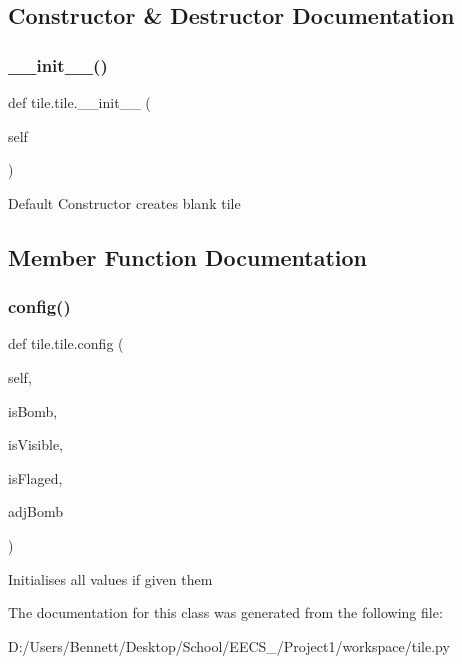 \subsection{Constructor \& Destructor Documentation}
\mbox{\label{classtile_1_1tile_a8a06fff9b10c8cb32195e21005d9ebc3}} 
\subsubsection{\texorpdfstring{\+\_\+\+\_\+init\+\_\+\+\_\+()}{\_\_init\_\_()}}
{\footnotesize\ttfamily def tile.\+tile.\+\_\+\+\_\+init\+\_\+\+\_\+ (\begin{DoxyParamCaption}\item[{}]{self }\end{DoxyParamCaption})}

\begin{DoxyVerb}Default Constructor creates blank tile
\end{DoxyVerb}
 

\subsection{Member Function Documentation}
\mbox{\label{classtile_1_1tile_ad7054ecde560f0a41204a149c806e351}} 
\subsubsection{\texorpdfstring{config()}{config()}}
{\footnotesize\ttfamily def tile.\+tile.\+config (\begin{DoxyParamCaption}\item[{}]{self,  }\item[{}]{is\+Bomb,  }\item[{}]{is\+Visible,  }\item[{}]{is\+Flaged,  }\item[{}]{adj\+Bomb }\end{DoxyParamCaption})}

\begin{DoxyVerb}Initialises all values if given them
\end{DoxyVerb}
 

The documentation for this class was generated from the following file\+:\begin{DoxyCompactItemize}
\item 
D\+:/\+Users/\+Bennett/\+Desktop/\+School/\+E\+E\+C\+S\+\_/\+Project1/workspace/tile.\+py\end{DoxyCompactItemize}
